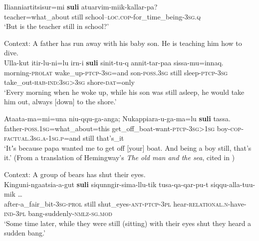\begin{exe}
	\ex
	\gll Ilianniartitsisur=mi \textbf{suli} atuarvim-miik-kallar-pa?\\
	teacher=what\_about still school--\textsc{loc}.\textsc{cop}-for\_time\_being-3\textsc{sg}.\textsc{q}\\
	\glt \lq But is the teacher still in school?' \parencite[10]{Fortescue1984}
	
	\ex
	Context: A father has run away with his baby son. He is teaching him how to dive.\\
	\gll Ulla-kut itir-lu-ni=lu irn-i \textbf{suli} sinit-tu-q annit-tar-paa sissa-mu=innaq.\\
	morning-\textsc{prolat} wake\_up-\textsc{ptcp}-3\textsc{sg}=and son-\textsc{poss}.3\textsc{sg} still sleep-\textsc{ptcp}-3\textsc{sg} take\_out-\textsc{hab}-\textsc{ind}:3\textsc{sg}>3\textsc{sg} shore-\textsc{dat}=only\\
	\glt \lq Every morning when he woke up, while his son was still asleep, he would take him out, always [down] to the shore.\rq{ }\parencite[Aataarsuup irnikasia]{BittnerTexts}
	
	\ex\label{exAppendixGreenlandic3}
	\gll Ataata-ma=mi=una niu-qqu-ga-anga; Nukappiara-u-ga-ma=lu \textbf{suli} tassa.\\
	father-\textsc{poss}.1\textsc{sg}=what\_about=this get\_off\_boat-want-\textsc{ptcp}-3\textsc{sg}>1\textsc{sg} boy-\textsc{cop}-\textsc{factual}.3\textsc{sg}.\textsc{a}-1\textsc{sg}.\textsc{p}=and still that's\_it\\
	\glt \lq Itʼs because papa wanted me to get off [your] boat. And being a boy still, that’s it.’ (From a translation of Hemingway’s \textit{The old man and the sea}, cited in \cite[370]{Bittner2005})

	\ex\label{exAppendixGreenlandic4}
	Context: A group of bears has shut their eyes.\\
	\gll Kinguni-ngaatsia-a-gut \textbf{suli} siqunngir-sima-llu-tik tusa-qa-qar-pu-t siqqu-alla-tuu-mik …\\
	after-a\_fair\_bit-3\textsc{sg}-\textsc{prol} still shut\_eyes-\textsc{ant}-\textsc{ptcp}-3\textsc{pl} hear-\textsc{relational}.\textsc{n}-have-\textsc{ind}-3\textsc{pl} bang-suddenly-\textsc{nmlz}-\textsc{sg}.\textsc{mod}\\
	\glt \lq Some time later, while they were still (sitting) with their eyes shut they heard a sudden bang.' \parencite[Silliarnamik uqaluttuaq]{BittnerTexts}
\end{exe}

